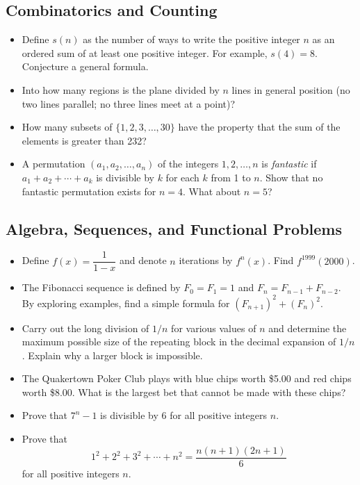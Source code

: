 \documentclass[12pt]{article}
\begin{document}
\subsection{Combinatorics and Counting}
\begin{itemize}
  \item Define $s(n)$ as the number of ways to write the positive integer $n$ as an ordered sum of at least one positive integer. For example, $s(4) = 8$. Conjecture a general formula.

  \item Into how many regions is the plane divided by $n$ lines in general position (no two lines parallel; no three lines meet at a point)?

  \item How many subsets of $\{1, 2, 3, \ldots, 30\}$ have the property that the sum of the elements is greater than 232?

  \item A permutation $(a_1, a_2, \ldots, a_n)$ of the integers $1, 2, \ldots, n$ is \emph{fantastic} if $a_1 + a_2 + \cdots + a_k$ is divisible by $k$ for each $k$ from 1 to $n$. Show that no fantastic permutation exists for $n = 4$. What about $n = 5$?
\end{itemize}

\subsection{Algebra, Sequences, and Functional Problems}
\begin{itemize}
  \item Define $f(x) = \dfrac{1}{1-x}$ and denote $n$ iterations by $f^n(x)$. Find $f^{1999}(2000)$.

  \item The Fibonacci sequence is defined by $F_0 = F_1 = 1$ and $F_n = F_{n-1} + F_{n-2}$. By exploring examples, find a simple formula for $(F_{n+1})^2 + (F_n)^2$.

  \item Carry out the long division of $1/n$ for various values of $n$ and determine the maximum possible size of the repeating block in the decimal expansion of $1/n$. Explain why a larger block is impossible.

  \item The Quakertown Poker Club plays with blue chips worth \$5.00 and red chips worth \$8.00. What is the largest bet that cannot be made with these chips?

  \item Prove that $7^n - 1$ is divisible by 6 for all positive integers $n$.

  \item Prove that
  \[
  1^2 + 2^2 + 3^2 + \cdots + n^2 = \frac{n(n+1)(2n+1)}{6}
  \]
  for all positive integers $n$.
\end{itemize}
\end{document}
